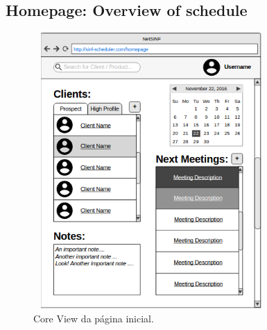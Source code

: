 \begin{titlepage}
\subsection{Homepage: Overview of schedule}

\begin{figure}[H]
  \centering
    \includegraphics[width=9cm, height = 10.5cm]{SINF_homepage.png}
  \caption{Core View da página inicial.}
  \label{uml}
\end{figure}


\end{titlepage}
